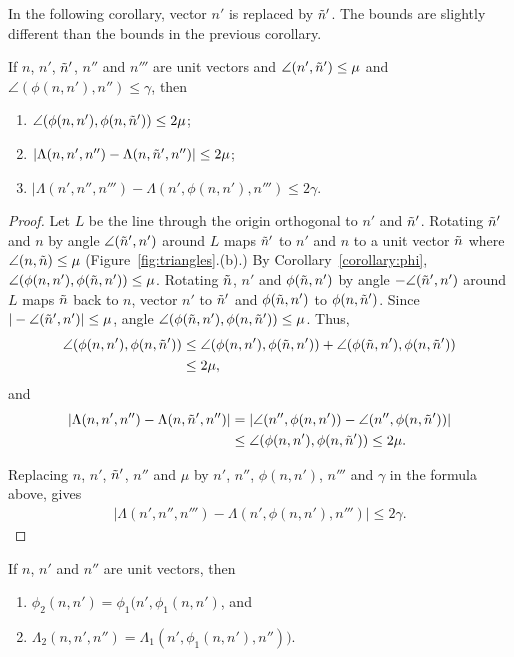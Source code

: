 In the following corollary,
vector $n'$ is replaced by $\tilde{n}'$.
The bounds are slightly different than the bounds in the previous corollary.
\begin{corollary}
If $n$, $n'$, $\tilde{n}'$, $n''$ and $n'''$ are unit vectors
and $\angle(n',\tilde{n}') \le \mu$ and $\angle(\phi(n,n'),n'') \le \gamma$, 
then
\begin{enumerate}
\item $\angle(\phi(n,n'),\phi(n,\tilde{n}')) \le 2\mu$;
\item $|\Lambda(n,n',n'') - \Lambda(n,\tilde{n}',n'')| \le 2\mu$;
\item $|\Lambda(n',n'',n''') - \Lambda(n',\phi(n,n'),n''') \le 2\gamma$.
\end{enumerate}
\label{corollary:phi:2}
\end{corollary}

\begin{proof}
Let $L$ be the line through the origin orthogonal to $n'$ and $\tilde{n}'$.
Rotating $\tilde{n}'$ and $n$ by angle $\angle(\tilde{n}',n')$ around $L$
maps $\tilde{n}'$ to $n'$ and $n$ to a unit vector $\tilde{n}$
where $\angle(n,\tilde{n}) \le \mu$ (Figure~\ref{fig:triangles}.(b).)
By Corollary~\ref{corollary:phi},
$\angle(\phi(n,n'),\phi(\tilde{n},n')) \le \mu$.
Rotating $\tilde{n}$, $n'$ and $\phi(\tilde{n},n')$ by angle $-\angle(\tilde{n}',n')$ around $L$
maps $\tilde{n}$ back to $n$, vector $n'$ to $\tilde{n}'$ and $\phi(\tilde{n},n')$
to $\phi(n,\tilde{n}')$.
Since $|-\angle(\tilde{n}',n')| \le \mu$,
angle $\angle(\phi(\tilde{n},n'),\phi(n,\tilde{n}')) \le \mu$.
Thus,
\begin{align*}
\angle(\phi(n,n'),\phi(n,\tilde{n}')) 
 & \le \angle(\phi(n,n'),\phi(\tilde{n},n')) + \angle(\phi(\tilde{n},n'),\phi(n,\tilde{n}')) \\
 & \le 2 \mu,
\end{align*}
and
\begin{align*}
|\Lambda(n,n',n'') - \Lambda(n,\tilde{n}',n'')| & = 
|\angle(n'', \phi(n,n')) - \angle(n'', \phi(n,\tilde{n}'))|  \\
  & \le \angle(\phi(n,n'),\phi(n,\tilde{n}')) \le 2\mu.
\end{align*}

Replacing $n$, $n'$, $\tilde{n}'$, $n''$ and $\mu$
by $n'$, $n''$, $\phi(n,n')$, $n'''$ and $\gamma$ in the formula above,
gives
\begin{align*}
|\Lambda(n',n'',n''') - \Lambda(n',\phi(n,n'),n''')| \le 2 \gamma.
\end{align*}

\end{proof}

\begin{lemma}
If $n$, $n'$ and $n''$ are unit vectors, then
\begin{enumerate}
\item $\phi_2(n,n') = \phi_1(n',\phi_1(n,n')$, and
\item $\Lambda_2(n,n',n'') = \Lambda_1(n', \phi_1(n,n'), n''))$.
\end{enumerate}
\label{lemma:Lambda2}
\end{lemma}

